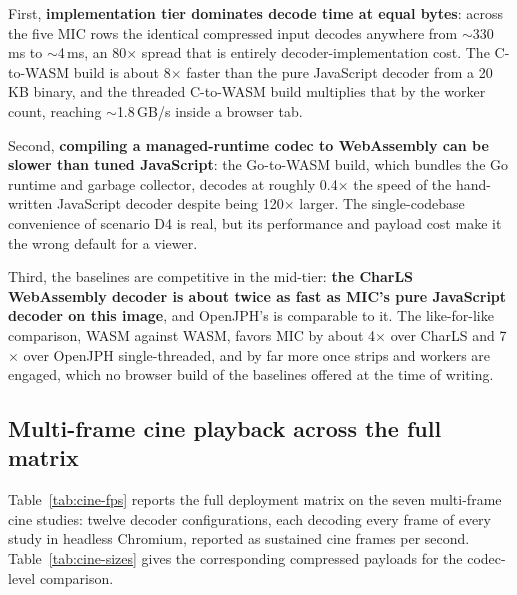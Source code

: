 \documentclass[journal]{IEEEtran}
\begin{document}
First, \textbf{implementation tier dominates decode time at equal bytes}:
across the five MIC rows the identical compressed input decodes anywhere
from ${\sim}$330\,ms to ${\sim}$4\,ms, an 80$\times$ spread that is entirely
decoder-implementation cost. The C-to-WASM build is about 8$\times$ faster
than the pure JavaScript decoder from a 20\,KB binary, and the threaded
C-to-WASM build multiplies that by the worker count, reaching
${\sim}$1.8\,GB/s inside a browser tab.

Second, \textbf{compiling a managed-runtime codec to WebAssembly can be
slower than tuned JavaScript}: the Go-to-WASM build, which bundles the Go
runtime and garbage collector, decodes at roughly 0.4$\times$ the speed of
the hand-written JavaScript decoder despite being 120$\times$ larger. The
single-codebase convenience of scenario D4 is real, but its performance and
payload cost make it the wrong default for a viewer.

Third, the baselines are competitive in the mid-tier: \textbf{the CharLS
WebAssembly decoder is about twice as fast as MIC's pure JavaScript decoder
on this image}, and OpenJPH's is comparable to it. The like-for-like
comparison, WASM against WASM, favors MIC by about 4$\times$ over CharLS
and 7$\times$ over OpenJPH single-threaded, and by far more once strips and
workers are engaged, which no browser build of the baselines offered at the
time of writing.

\subsection{Multi-frame cine playback across the full matrix}

Table~\ref{tab:cine-fps} reports the full deployment matrix on the seven
multi-frame cine studies: twelve decoder configurations, each decoding every
frame of every study in headless Chromium, reported as sustained cine
frames per second. Table~\ref{tab:cine-sizes} gives the corresponding
compressed payloads for the codec-level comparison.
\end{document}
